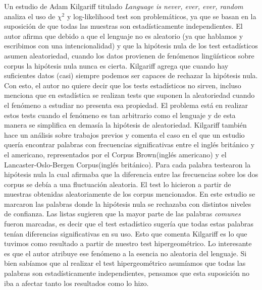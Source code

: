 Un estudio de Adam Kilgariff titulado \textit{Language is never, ever, ever, random}\cite {kilgarriff2005language} analiza el uso de ${\chi}^2$ y log-likelihood test son problemáticos, ya que se basan en la suposición de que todas las muestras son estadísticamente independientes. 
El autor afirma que debido a que el lenguaje no es aleatorio (ya que hablamos y escribimos con una intencionalidad) y que la hipótesis nula de los test estadísticos asumen aleatoriedad, cuando los datos provienen de fenómenos lingüísticos sobre corpus la hipótesis nula nunca es cierta. 
Kilgariff agrega que cuando hay suficientes datos (casi) siempre podemos ser capaces de rechazar la hipótesis nula. Con esto, el autor no quiere decir que los tests estadísticos no sirven, incluso menciona que en estadística se realizan tests que suponen la aleatoriedad cuando el fenómeno a estudiar no presenta esa propiedad. El problema está en realizar estos tests cuando el fenómeno es tan arbitrario como el lenguaje y de esta manera se simplifica en demasía la hipótesis de aleatoriedad.
Kilgariff también hace un análisis sobre trabajos previos y comenta el caso en el que un estudio quería encontrar palabras con frecuencias significativas entre el inglés británico y el americano, representados por el Corpus Brown(inglés americano) y el Lancaster-Oslo-Bergen Corpus(inglés británico). Para cada palabra testearon la hipótesis nula la cual afirmaba que la diferencia entre las frecuencias sobre los dos corpus se debía a una fluctuación  aleatoria. El test lo hicieron a partir de muestras obtenidas aleatoriamente de los corpus mencionados. En este estudio se marcaron las palabras donde la hipótesis nula se rechazaba con distintos niveles de confianza. Las listas sugieren que la mayor parte de las palabras \textit{comunes} fueron marcadas, es decir que el test estadístico sugería que todas estas palabras tenían diferencias significativas en su uso. Esto que comenta Kilgariff es lo que tuvimos como resultado a partir de nuestro test hipergeométrico. Lo interesante es que el autor atribuye ese fenómeno a la esencia no aleatoria del lenguaje. Si bien sabíamos que al realizar el test hipergeométrico asumíamos que todas las palabras son estadísticamente independientes, pensamos que esta suposición no iba a afectar tanto los resultados como lo hizo.

